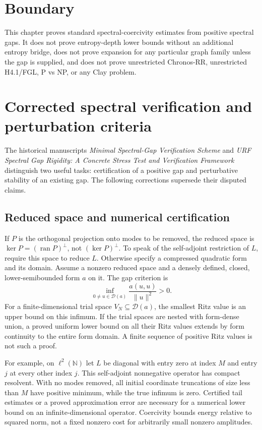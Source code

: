 \section{Boundary}

This chapter proves standard spectral-coercivity estimates from positive
spectral gaps. It does not prove entropy-depth lower bounds without an
additional entropy bridge, does not prove expansion for any particular graph
family unless the gap is supplied, and does not prove unrestricted Chronos-RR,
unrestricted H4.1/FGL, P vs NP, or any Clay problem.


\section{Corrected spectral verification and perturbation criteria}
The historical manuscripts \emph{Minimal Spectral-Gap Verification Scheme} and \emph{URF Spectral Gap Rigidity: A Concrete Stress Test and Verification Framework} distinguish two useful tasks: certification of a positive gap and perturbative stability of an existing gap. The following corrections supersede their disputed claims.

\subsection{Reduced space and numerical certification}
If $P$ is the orthogonal projection onto modes to be removed, the reduced space is $\ker P={(\operatorname{ran}P)}^\perp$, not ${(\ker P)}^\perp$. To speak of the self-adjoint restriction of $L$, require this space to reduce $L$. Otherwise specify a compressed quadratic form and its domain. Assume a nonzero reduced space and a densely defined, closed, lower-semibounded form $a$ on it. The gap criterion is
\[
\inf_{0\ne u\in\mathcal D(a)}\frac{a(u,u)}{\|u\|^2}>0.
\]
For a finite-dimensional trial space $V_N\subseteq\mathcal D(a)$, the smallest Ritz value is an upper bound on this infimum. If the trial spaces are nested with form-dense union, a proved uniform lower bound on all their Ritz values extends by form continuity to the entire form domain. A finite sequence of positive Ritz values is not such a proof.

For example, on $\ell^2(\mathbb N)$ let $L$ be diagonal with entry zero at index $M$ and entry $j$ at every other index $j$. This self-adjoint nonnegative operator has compact resolvent. With no modes removed, all initial coordinate truncations of size less than $M$ have positive minimum, while the true infimum is zero. Certified tail estimates or a proved approximation error are necessary for a numerical lower bound on an infinite-dimensional operator. Coercivity bounds energy relative to squared norm, not a fixed nonzero cost for arbitrarily small nonzero amplitudes.

